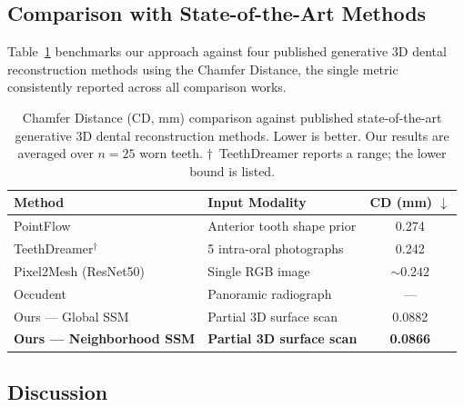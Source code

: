 \documentclass[11pt,a4paper]{article}
\begin{document}
\subsection{Comparison with State-of-the-Art Methods}
\label{sec:comparison}

Table~\ref{tab:sota} benchmarks our approach against four published
generative 3D dental reconstruction methods using the Chamfer
Distance, the single metric consistently reported across all
comparison works.

\begin{table}[ht]
\centering
\caption{Chamfer Distance (CD, mm) comparison against published
  state-of-the-art generative 3D dental reconstruction methods.
  Lower is better.
  Our results are averaged over $n=25$ worn teeth.
  $\dagger$~TeethDreamer reports a range; the lower bound is listed.}
\label{tab:sota}
\setlength{\tabcolsep}{8pt}
\renewcommand{\arraystretch}{1.25}
\begin{tabular}{llc}
\toprule
\textbf{Method} & \textbf{Input Modality} & \textbf{CD (mm) $\downarrow$} \\
\midrule
PointFlow~\cite{pointflow2025}
  & Anterior tooth shape prior & 0.274 \\
TeethDreamer$^\dagger$~\cite{teethDreamer2024}
  & 5 intra-oral photographs & 0.242 \\
Pixel2Mesh (ResNet50)~\cite{pmcauto2025}
  & Single RGB image & ${\sim}0.242$ \\
Occudent~\cite{occudent2023}
  & Panoramic radiograph & --- \\
\midrule
Ours --- Global SSM
  & Partial 3D surface scan & 0.0882 \\
\rowcolor{bestrow}
\textbf{Ours --- Neighborhood SSM}
  & \textbf{Partial 3D surface scan} & \textbf{0.0866} \\
\bottomrule
\end{tabular}
\end{table}

\subsection{Discussion}
\label{sec:discussion}
\end{document}
